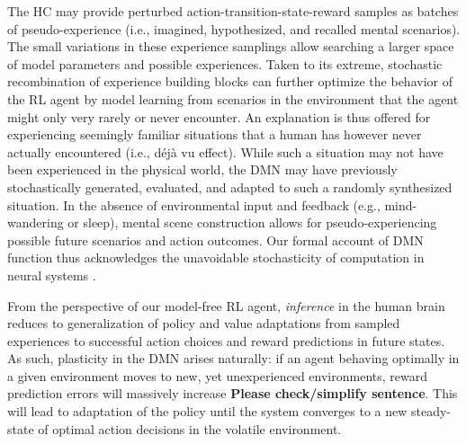 \documentclass[10pt,letterpaper]{article}
\begin{document}
The HC may provide perturbed action-transition-state-reward samples
  as batches of pseudo-experience
  (i.e., imagined, hypothesized, and recalled mental scenarios).
  The small variations in these experience samplings allow searching
  a larger space of model parameters and possible experiences.
  Taken to its extreme, stochastic recombination of experience
  building blocks can further optimize the behavior of the RL agent
  by model learning from scenarios in the environment that the agent might
  only very rarely or never encounter.
  An explanation is thus offered for experiencing seemingly familiar situations that
  a human has however never actually encountered (i.e., d\'{e}j\`{a} vu effect).
  While such a situation may not have been experienced in the physical world,
  the DMN may have previously stochastically generated, evaluated, and adapted to
  such a randomly synthesized situation.
  In the absence of environmental input and feedback
  (e.g., mind-wandering or sleep),
  mental scene construction allows for pseudo-experiencing possible
  future scenarios and action outcomes.
  Our formal account of DMN function
  thus acknowledges the unavoidable stochasticity of
  computation in neural systems \citep{faisal2008noise}.


  From the perspective of our model-free RL agent,
  \textit{inference} in the human brain reduces to
  generalization of
  policy and value adaptations from sampled experiences to
  successful action choices and reward predictions in future states.
  As such,
  plasticity in the DMN arises naturally:
  if an agent behaving optimally in a given environment moves
  to new, yet unexperienced environments, reward prediction errors will
  massively increase \textbf{Please check/simplify sentence}.
  This will lead to adaptation of the policy until the system converges to a
  new steady-state of optimal action decisions in the volatile environment.

\end{document}
